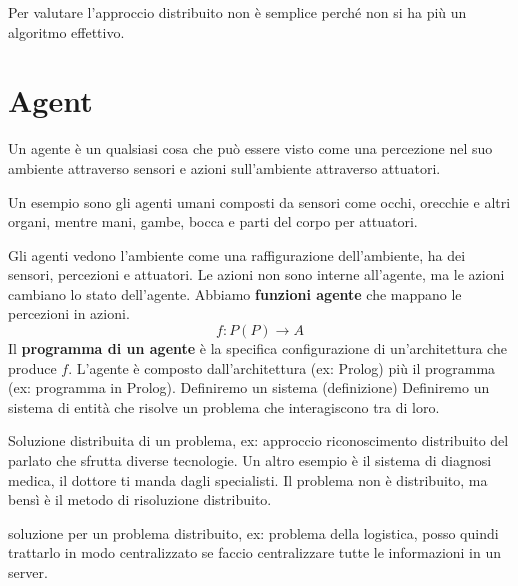 Per valutare l'approccio distribuito non è semplice perché non si ha più un 
algoritmo effettivo.

\section{Agent}
\begin{definizione}
    Un agente è un qualsiasi cosa che può essere visto come una percezione nel 
    suo ambiente attraverso sensori e azioni sull'ambiente attraverso attuatori.
\end{definizione}

\begin{esempio}
    Un esempio sono gli agenti umani composti da sensori come occhi, orecchie e altri
    organi, mentre mani, gambe, bocca e parti del corpo per attuatori.
\end{esempio}

Gli agenti vedono l'ambiente come una raffigurazione dell'ambiente, ha dei sensori,
percezioni e attuatori. Le azioni non sono interne all'agente, ma le azioni cambiano
lo stato dell'agente. Abbiamo \textbf{funzioni agente} che mappano le percezioni
in azioni.
$$f:P(P)\rightarrow A$$
Il \textbf{programma di un agente} è la specifica configurazione di un'architettura che 
produce $f$.
L'agente è composto dall'architettura (ex: Prolog) più il programma (ex: programma in Prolog).
Definiremo un sistema (definizione)
Definiremo un sistema di entità che risolve un problema che interagiscono tra di loro.

Soluzione distribuita di un problema, ex: approccio riconoscimento distribuito 
del parlato che sfrutta diverse tecnologie. Un altro esempio è il sistema di diagnosi
medica, il dottore ti manda dagli specialisti. Il problema non è distribuito,
ma bensì è il metodo di risoluzione distribuito.

soluzione per un problema distribuito, ex: problema della logistica, posso quindi
trattarlo in modo centralizzato se faccio centralizzare tutte le informazioni in
un server.